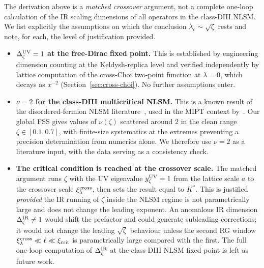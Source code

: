 The derivation above is a \emph{matched crossover} argument, not a
complete one-loop calculation of the IR scaling dimensions of all
operators in the class-DIII NLSM.  We list explicitly the assumptions
on which the conclusion $\lambda_c\sim\sqrt{\zeta}$ rests and note,
for each, the level of justification provided.

\begin{itemize}
  \item \textbf{$\Delta_\zeta^{\rm UV}=1$ at the free-Dirac fixed point.}
    This is established by engineering dimension counting at the
    Keldysh-replica level and verified independently by lattice
    computation of the cross-Choi two-point function at $\lambda=0$,
    which decays as $x^{-2}$ (Section~\ref{sec:cross-choi}).  No
    further assumptions enter.

  \item \textbf{$\nu=2$ for the class-DIII multicritical NLSM.}
    This is a known result of the disordered-fermion NLSM
    literature~\cite{KonigBrouwer2014}, used in the MIPT context
    by~\cite{LeGalSchiro2025}.  Our global FSS gives values of
    $\nu(\zeta)$ scattered around $2$ in the clean range
    $\zeta\in[0.1,0.7]$, with finite-size systematics at the extremes
    preventing a precision determination from numerics alone.  We
    therefore use $\nu=2$ as a literature input, with the data
    serving as a consistency check.

  \item \textbf{The critical condition is reached at the crossover scale.}
    The matched argument runs $\zeta$ with the UV eigenvalue
    $y_\zeta^{\rm UV}=1$ from the lattice scale $a$ to the crossover
    scale $\xi_\lambda^{\rm cross}$, then sets the result equal to
    $K^\ast$.  This is justified \emph{provided} the IR running of
    $\zeta$ inside the NLSM regime is not parametrically large and
    does not change the leading exponent.  An anomalous IR dimension
    $\Delta_\zeta^{\rm IR}\neq 1$ would shift the prefactor and could
    generate subleading corrections; it would not change the leading
    $\sqrt{\zeta}$ behaviour unless the second RG window
    $\xi_\lambda^{\rm cross}\ll \ell\ll\xi_{\rm crit}$ is
    parametrically large compared with the first.  The full one-loop
    computation of $\Delta_\zeta^{\rm IR}$ at the class-DIII NLSM
    fixed point is left as future work.


\end{itemize}
